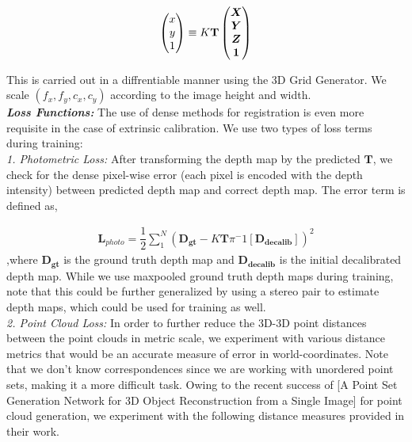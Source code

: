 \documentclass[letterpaper, 10 pt, conference]{ieeeconf}  %
\begin{document}
\begin{equation}
\begin{split}
    \left(
    \begin{matrix}
    x\\ 
    y\\ 
    1\\
    \end{matrix}
    \right) \equiv
    \boldmath{K}
    \mathbf{T}
    \left(
    \begin{matrix}
    X\\ 
    Y\\ 
    Z\\
    1\\
    \end{matrix}
    \right)\\
\end{split}
\end{equation} 

This is carried out in a diffrentiable manner using the 3D Grid Generator. We scale $(f_x, f_y, c_x, c_y)$ according to the image height and width.\\

\textbf{\textit{Loss Functions:}} The use of dense methods for registration is even more requisite in the case of extrinsic calibration. We use two types of loss terms during training:\\

\textit{1. Photometric Loss:} After transforming the depth map by the predicted $\mathbf{T}$, we check for the dense pixel-wise error (each pixel is encoded with the depth intensity) between predicted depth map and correct depth map. The error term is defined as,

\begin{equation}
\begin{split}
    \mathbf{L}_{photo} = \dfrac{1}{2}\sum_{1}^{N}\left(\mathbf{D_{gt}} - K\mathbf{T}\pi^-1[\mathbf{D_{decalib}}] \right)^2
\end{split}
\end{equation} 
,where $\mathbf{D_{gt}}$ is the ground truth depth map and $\mathbf{D_{decalib}}$ is the initial decalibrated depth map. While we use maxpooled ground truth depth maps during training, note that this could be further generalized by using a stereo pair to estimate depth maps, which could be used for training as well.\\

\textit{2. Point Cloud Loss:} In order to further reduce the 3D-3D point distances between the point clouds in metric scale, we experiment with various distance metrics that would be an accurate measure of error in world-coordinates. Note that we don't know correspondences since we are working with unordered point sets, making it a more difficult task. Owing to the recent success of [A Point Set Generation Network for 3D Object Reconstruction from a Single Image] for point cloud generation, we experiment with the following distance measures provided in their work.\\
\end{document}
